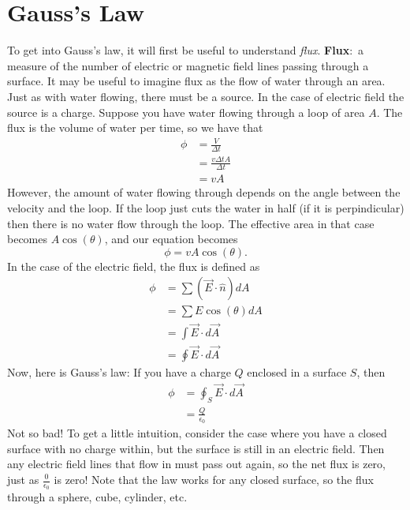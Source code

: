 \documentclass[nobib]{tufte-handout}
\newcommand{\defn}[2]{\noindent\textbf{#1}:\ #2}
\begin{document}
\section{Gauss's Law}
To get into Gauss's law, it will first be useful to understand \emph{flux}. 
\defn{Flux}{a measure of the number of electric or magnetic field lines 
passing through a surface.} 
It may be useful to imagine flux as the flow of water through an area. 
Just as with water flowing, there must be a source. In the case of electric field 
the source is a charge. Suppose you have water flowing through a loop of area $A$. 
The flux is the volume of water per time, so we have that 
\begin{align*}
    \phi &= \frac{V}{\Delta t} \\
    &= \frac{v \Delta t A}{\Delta t} \\
    &= vA
\end{align*}
However, the amount of water flowing through depends on the angle between the 
velocity and the loop. If the loop just cuts the water in half (if it is perpindicular)
then there is no water flow through the loop. The effective area in that case becomes 
$A \cos(\theta)$, and our equation becomes 
\[\phi = vA\cos(\theta).\]
In the case of the electric field, the flux is defined as
\begin{align*}
    \phi &= \sum (\vec{E} \cdot \hat{n}) dA \\
    &= \sum E\cos(\theta) dA \\
    &= \int \vec{E} \cdot d\vec{A} \\
    &= \oint \vec{E} \cdot d\vec{A}
\end{align*}
Now, here is Gauss's law: 
If you have a charge $Q$ enclosed in a surface $S$, 
then 
\begin{align*}
    \phi &= \oint_S \vec{E} \cdot d\vec{A} \\
    &= \frac{Q}{\epsilon_0}
\end{align*}
Not so bad! To get a little intuition, consider
the case where you have a closed surface with 
no charge within, but the surface is still in an
electric field. Then any electric field lines that 
flow in must pass out again, so the net flux is 
zero, just as $\frac{0}{\epsilon_0}$ is zero!
Note that the law works for any closed surface, so 
the flux through a sphere, cube, cylinder, etc. 
\end{document}
